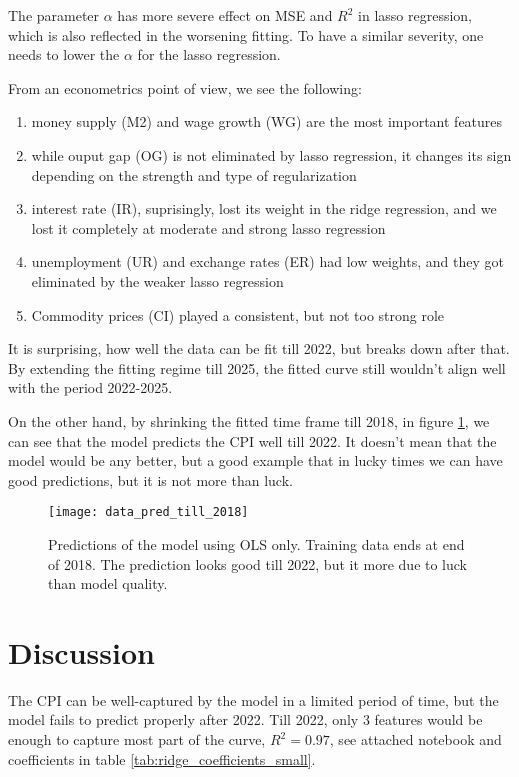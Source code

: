 \documentclass{article}
\begin{document}
The parameter $\alpha$ has more severe effect on MSE and $R^2$ in lasso regression,
which is also reflected in the worsening fitting. To have a similar severity,
one needs to lower the $\alpha$ for the lasso regression.

From an econometrics point of view, we see the following:
\begin{enumerate}
      \item  money supply (M2) and wage growth (WG) are the most important features
      \item while ouput gap (OG) is not eliminated by lasso regression,
            it changes its sign depending on the strength and type of regularization
      \item interest rate (IR), suprisingly, lost its weight in the ridge regression,
            and we lost it completely at moderate and strong lasso regression
      \item unemployment (UR) and exchange rates (ER) had low weights,
            and they got eliminated by the weaker lasso regression
      \item Commodity prices (CI) played a consistent, but not too strong role
\end{enumerate}

It is surprising, how well the data can be fit till 2022, but breaks down after that.
By extending the fitting regime till 2025, the fitted curve still wouldn't align well with the
period 2022-2025.

On the other hand, by shrinking the fitted time frame till 2018,
in figure \ref{fig:ridge_predictions_2018},
we can see that the model predicts the CPI well till 2022.
It doesn't mean that the model would be any better,
but a good example that in lucky times we can have good predictions,
but it is not more than luck.

\begin{figure}
      \centering
      \texttt{[image: data\_pred\_till\_2018]}
      \caption{Predictions of the model using OLS only.
            Training data ends at end of 2018.
            The prediction looks good till 2022,
            but it more due to luck than model quality.}
      \label{fig:ridge_predictions_2018}
\end{figure}


\section*{Discussion}
The CPI can be well-captured by the model in a limited period of time,
but the model fails to predict properly after 2022. Till 2022,
only 3 features would be enough to capture most part of the curve,
$R^2 = 0.97$, see attached notebook and coefficients in table \ref{tab:ridge_coefficients_small}.
\end{document}

